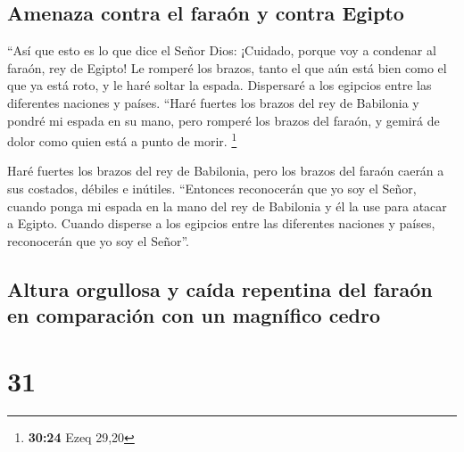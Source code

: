 \hypertarget{amenaza-contra-el-farauxf3n-y-contra-egipto}{%
\subsection{Amenaza contra el faraón y contra
Egipto}\label{amenaza-contra-el-farauxf3n-y-contra-egipto}}

 ``Así que esto es lo que dice el Señor Dios: ¡Cuidado,
porque voy a condenar al faraón, rey de Egipto! Le romperé los brazos,
tanto el que aún está bien como el que ya está roto, y le haré soltar la
espada.  Dispersaré a los egipcios entre las diferentes
naciones y países.  ``Haré fuertes los brazos del rey de
Babilonia y pondré mi espada en su mano, pero romperé los brazos del
faraón, y gemirá de dolor como quien está a punto de morir. \footnote{\textbf{30:24}
  Ezeq 29,20}

 Haré fuertes los brazos del rey de Babilonia, pero los
brazos del faraón caerán a sus costados, débiles e inútiles. ``Entonces
reconocerán que yo soy el Señor, cuando ponga mi espada en la mano del
rey de Babilonia y él la use para atacar a Egipto. 
Cuando disperse a los egipcios entre las diferentes naciones y países,
reconocerán que yo soy el Señor''.

\hypertarget{altura-orgullosa-y-cauxedda-repentina-del-farauxf3n-en-comparaciuxf3n-con-un-magnuxedfico-cedro}{%
\subsection{Altura orgullosa y caída repentina del faraón en comparación
con un magnífico
cedro}\label{altura-orgullosa-y-cauxedda-repentina-del-farauxf3n-en-comparaciuxf3n-con-un-magnuxedfico-cedro}}

\hypertarget{section-30}{%
\section{31}\label{section-30}}

